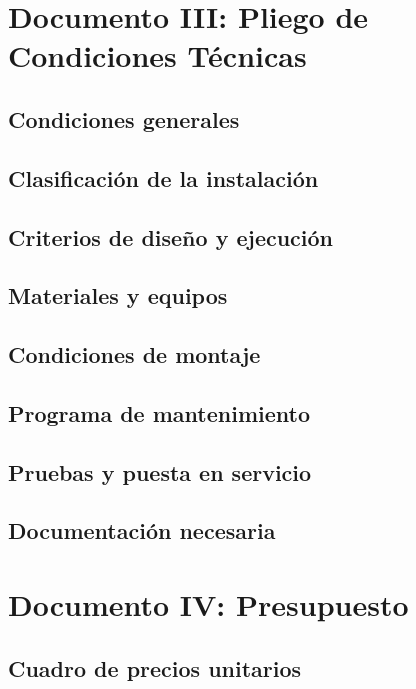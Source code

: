 \documentclass[12pt,a4paper,oneside]{report}
\begin{document}
\chapter{Documento III: Pliego de Condiciones Técnicas}
\section{Condiciones generales}
\section{Clasificación de la instalación}
\section{Criterios de diseño y ejecución}
\section{Materiales y equipos}
\section{Condiciones de montaje}
\section{Programa de mantenimiento}
\section{Pruebas y puesta en servicio}
\section{Documentación necesaria}





\clearpage

\chapter{Documento IV: Presupuesto}


\section{Cuadro de precios unitarios}
\end{document}
